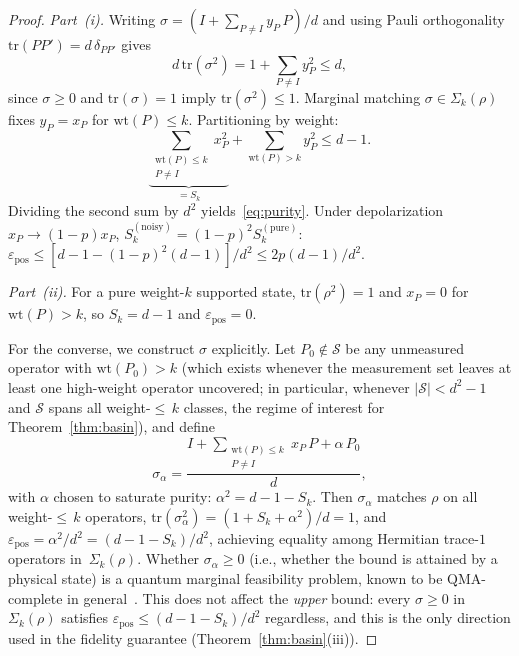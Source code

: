 \documentclass[twocolumn,prx,aps,superscriptaddress,longbibliography,floatfix]{revtex4-2}
\begin{document}
\begin{proof}
\emph{Part~(i).}
Writing $\sigma = (I + \sum_{P \neq I} y_P\, P)/d$ and using
Pauli orthogonality $\mathrm{tr}(PP') = d\,\delta_{PP'}$
gives~\cite{Paris2004,Holevo2011}
\begin{equation}\label{eq:bloch-purity}
  d\,\mathrm{tr}(\sigma^2) = 1 + \sum_{P \neq I} y_P^2 \le d,
\end{equation}
since $\sigma \ge 0$ and $\mathrm{tr}(\sigma) = 1$ imply
$\mathrm{tr}(\sigma^2) \le 1$.
Marginal matching $\sigma \in \Sigma_k(\rho)$ fixes
$y_P = x_P$ for $\mathrm{wt}(P) \le k$.  Partitioning
by weight:
\[
\underbrace{\sum_{\substack{\mathrm{wt}(P) \le k \\ P \neq I}} x_P^2}_{= S_k}
+ \sum_{\mathrm{wt}(P) > k} y_P^2 \le d - 1.
\]
Dividing the second sum by $d^2$ yields~\eqref{eq:purity}.
Under depolarization $x_P \to (1{-}p)x_P$,
$S_k^{(\mathrm{noisy})} = (1{-}p)^2 S_k^{(\mathrm{pure})}$:
$\varepsilon_{\mathrm{pos}} \le
[d{-}1 - (1{-}p)^2(d{-}1)]/d^2 \le 2p(d{-}1)/d^2$.

\emph{Part~(ii).}
For a pure weight-$k$ supported state, $\mathrm{tr}(\rho^2) = 1$ and
$x_P = 0$ for $\mathrm{wt}(P) > k$, so
$S_k = d - 1$ and $\varepsilon_{\mathrm{pos}} = 0$.

For the converse, we construct $\sigma$ explicitly.
Let $P_0 \notin \mathcal{S}$ be any unmeasured operator with
$\mathrm{wt}(P_0) > k$
(which exists whenever the measurement set leaves at least one
high-weight operator uncovered; in particular, whenever
$|\mathcal{S}| < d^2 - 1$ and $\mathcal{S}$ spans all
weight-${\le}\,k$ classes, the regime of interest for
Theorem~\ref{thm:basin}),
and define
\[
  \sigma_\alpha = \frac{I + \sum_{\substack{\mathrm{wt}(P) \le k \\ P \neq I}}
  x_P\, P + \alpha\, P_0}{d},
\]
with $\alpha$ chosen to saturate purity:
$\alpha^2 = d - 1 - S_k$.  Then $\sigma_\alpha$ matches
$\rho$ on all weight-${\le}\,k$ operators,
$\mathrm{tr}(\sigma_\alpha^2) = (1 + S_k + \alpha^2)/d = 1$,
and $\varepsilon_{\mathrm{pos}} = \alpha^2/d^2
= (d{-}1{-}S_k)/d^2$, achieving equality among
Hermitian trace-$1$ operators in~$\Sigma_k(\rho)$.
Whether $\sigma_\alpha \ge 0$ (i.e., whether the
bound is attained by a physical state) is a quantum
marginal feasibility problem, known to be
$\mathrm{QMA}$-complete in
general~\cite{Liu2006,Wei2010}.
This does not affect
the \emph{upper} bound: every $\sigma \ge 0$ in
$\Sigma_k(\rho)$ satisfies
$\varepsilon_{\mathrm{pos}} \le (d{-}1{-}S_k)/d^2$
regardless, and this is the only direction used in the
fidelity guarantee (Theorem~\ref{thm:basin}(iii)).
\end{proof}
\end{document}

